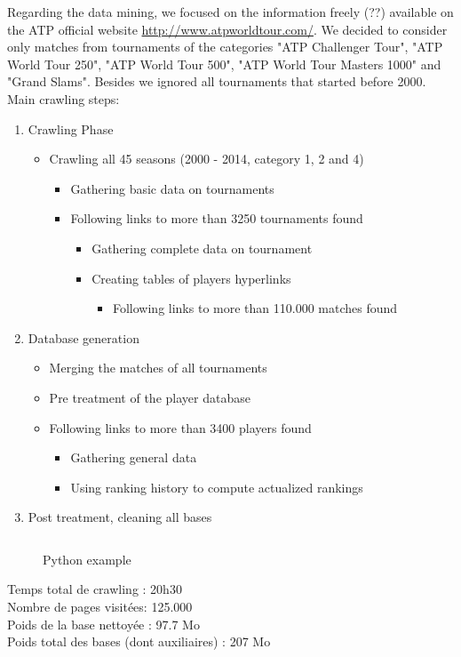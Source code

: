 \documentclass[a4paper]{article}
\begin{document}
Regarding the data mining, we focused on the information freely (??) available on the ATP official website \url{http://www.atpworldtour.com/}. We decided to consider only matches from tournaments of the categories "ATP Challenger Tour", "ATP World Tour 250", "ATP World Tour 500", "ATP World Tour Masters 1000" and "Grand Slams". Besides we ignored all tournaments that started before 2000.\\


Main crawling steps:
\begin{enumerate}
\item Crawling Phase
\begin{itemize}
	\item Crawling all 45 seasons (2000 - 2014, category 1, 2 and 4)
	\begin{itemize}
		\item Gathering basic data on tournaments
		\item Following links to more than 3250 tournaments found
		\begin{itemize}
			\item Gathering complete data on tournament
			\item Creating tables of players hyperlinks
			\begin{itemize}
				\item Following links to more than 110.000 matches found
			\end{itemize}
		\end{itemize}
	\end{itemize}
\end{itemize}
\item Database generation
\begin{itemize}
	\item Merging the matches of all tournaments
	\item Pre treatment of the player database
	\item Following links to more than 3400 players found
	\begin{itemize}
		\item Gathering general data
		\item Using ranking history to compute actualized rankings
	\end{itemize}
\end{itemize}
\item Post treatment, cleaning all bases
\end{enumerate}


\begin{figure}[!b]
\begin{lstlisting}

\end{lstlisting}
\caption{Python example}
\label{fig:pythEx}
\end{figure}


Temps total de crawling : 20h30\\
Nombre de pages visitées: 125.000\\
Poids de la base nettoyée : 97.7 Mo\\
Poids total des bases (dont auxiliaires) : 207 Mo
\end{document}
